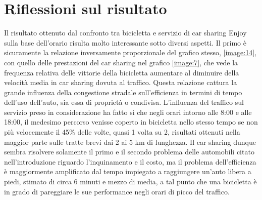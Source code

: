 \section{Riflessioni sul risultato}

Il risultato ottenuto dal confronto tra bicicletta e servizio di car sharing Enjoy sulla base dell'orario risulta molto interessante sotto diversi aspetti. Il primo è sicuramente la relazione inversamente proporzionale del grafico stesso, \ref{image:14}, con quello delle prestazioni del car sharing nel grafico \ref{image:7}, che vede la frequenza relativa delle vittorie della bicicletta aumentare al diminuire della velocità media in car sharing dovuta al traffico. Questa relazione cattura la grande influenza della congestione stradale sull'efficienza in termini di tempo dell'uso dell'auto, sia essa di proprietà o condivisa. L'influenza del traffico sul servizio preso in considerazione ha fatto sì che negli orari intorno alle 8:00 e alle 18:00, il medesimo percorso venisse coperto in bicicletta nello stesso tempo se non più velocemente il 45\% delle volte, quasi 1 volta su 2, risultati ottenuti nella maggior parte sulle tratte brevi dai 2 ai 5 km di lunghezza. Il car sharing dunque sembra risolvere solamente il primo e il secondo problema delle automobili citato nell'introduzione riguardo l'inquinamento e il costo, ma il problema dell'efficienza è maggiormente amplificato dal tempo impiegato a raggiungere un'auto libera a piedi, stimato di circa 6 minuti e mezzo di media, a tal punto che una bicicletta è in grado di pareggiare le sue performance negli orari di picco del traffico.

